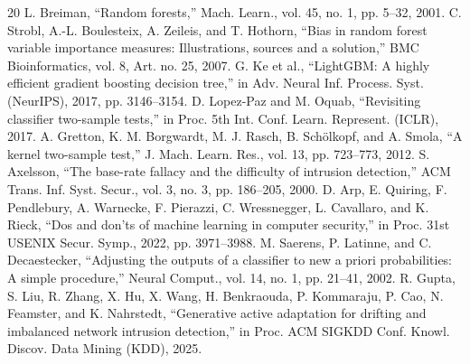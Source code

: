 \documentclass[conference]{IEEEtran}
\begin{document}
\begin{thebibliography}{20}
 L. Breiman, ``Random forests,'' Mach. Learn., vol. 45, no. 1, pp. 5--32, 2001.
 C. Strobl, A.-L. Boulesteix, A. Zeileis, and T. Hothorn, ``Bias in random forest variable importance measures: Illustrations, sources and a solution,'' BMC Bioinformatics, vol. 8, Art. no. 25, 2007.
 G. Ke et al., ``LightGBM: A highly efficient gradient boosting decision tree,'' in Adv. Neural Inf. Process. Syst. (NeurIPS), 2017, pp. 3146--3154.
 D. Lopez-Paz and M. Oquab, ``Revisiting classifier two-sample tests,'' in Proc. 5th Int. Conf. Learn. Represent. (ICLR), 2017.
 A. Gretton, K. M. Borgwardt, M. J. Rasch, B. Schölkopf, and A. Smola, ``A kernel two-sample test,'' J. Mach. Learn. Res., vol. 13, pp. 723--773, 2012.
 S. Axelsson, ``The base-rate fallacy and the difficulty of intrusion detection,'' ACM Trans. Inf. Syst. Secur., vol. 3, no. 3, pp. 186--205, 2000.
 D. Arp, E. Quiring, F. Pendlebury, A. Warnecke, F. Pierazzi, C. Wressnegger, L. Cavallaro, and K. Rieck, ``Dos and don'ts of machine learning in computer security,'' in Proc. 31st USENIX Secur. Symp., 2022, pp. 3971--3988.
 M. Saerens, P. Latinne, and C. Decaestecker, ``Adjusting the outputs of a classifier to new a priori probabilities: A simple procedure,'' Neural Comput., vol. 14, no. 1, pp. 21--41, 2002.
 R. Gupta, S. Liu, R. Zhang, X. Hu, X. Wang, H. Benkraouda, P. Kommaraju, P. Cao, N. Feamster, and K. Nahrstedt, ``Generative active adaptation for drifting and imbalanced network intrusion detection,'' in Proc. ACM SIGKDD Conf. Knowl. Discov. Data Mining (KDD), 2025.
\end{thebibliography}
\end{document}

